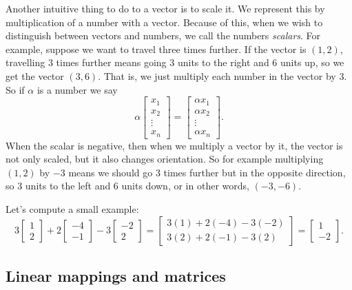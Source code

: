 Another intuitive thing to do to a vector is to scale it.
We represent this by multiplication of a number with a vector.
Because of this, when we wish to distinguish between vectors and numbers, we
call the numbers \emph{scalars}.
For example,
suppose we want to travel three times further.  If the vector is $(1,2)$,
travelling 3 times further means going 3 units to the right and 6 units up,
so we get the vector $(3,6)$.
That is, we just multiply each number in the vector by 3.  So if $\alpha$
is a number we say
\begin{equation*}
\alpha
\begin{bmatrix}
x_{1} \\ x_2 \\ \vdots \\ x_n
\end{bmatrix} =
\begin{bmatrix}
\alpha x_{1} \\ \alpha x_2 \\ \vdots \\ \alpha x_n
\end{bmatrix} .
\end{equation*}
When the scalar is negative, then when we multiply a vector by it, the
vector is not only scaled, but it also changes orientation.  So for example
multiplying $(1,2)$ by $-3$ means we should go 3 times further but in the
opposite direction, so 3 units to the left and 6 units down, or in other
words, $(-3,-6)$.

Let's compute a small example:
\begin{equation*}
3
\begin{bmatrix}
1 \\ 2
\end{bmatrix}
+
2
\begin{bmatrix}
-4 \\ -1
\end{bmatrix} 
-
3
\begin{bmatrix}
-2 \\ 2
\end{bmatrix} 
=
\begin{bmatrix}
3(1)+2(-4)-3(-2) \\ 3(2)+2(-1)-3(2)
\end{bmatrix}
=
\begin{bmatrix}
1 \\ -2
\end{bmatrix}
.
\end{equation*}

\subsection{Linear mappings and matrices}


